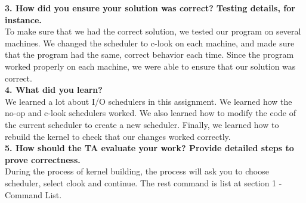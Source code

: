 \documentclass[10pt,letterpaper]{article}
\begin{document}
\textbf{3. How did you ensure your solution was correct? Testing details, for instance.}\\

To make sure that we had the correct solution, we tested our program on several machines. We changed the scheduler to c-look on each machine, and made sure that the program had the same, correct behavior each time. Since the program worked properly on each machine, we were able to ensure that our solution was correct. \\

\textbf{4. What did you learn?}\\

We learned a lot about I/O schedulers in this assignment. We learned how the no-op and c-look schedulers worked. We also learned how to modify the code of the current scheduler to create a new scheduler. Finally, we learned how to rebuild the kernel to check that our changes worked correctly. \\

\textbf{5. How should the TA evaluate your work? Provide detailed steps to prove correctness.}\\

During the process of kernel building, the process will ask you to choose scheduler, select clook and continue. The rest command is list at section 1 - Command List. 
\end{document}
